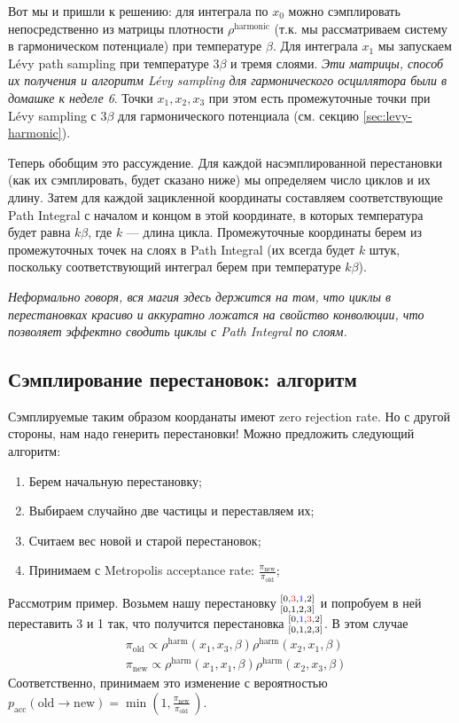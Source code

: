 \begin{lecture}
Вот мы и пришли к решению: для интеграла по $x_0$ можно сэмплировать непосредственно из матрицы плотности $\rho^{\text{harmonic}}$ (т.к. мы рассматриваем систему в гармоническом потенциале) при температуре $\beta$.
Для интеграла $x_1$ мы запускаем Lévy path sampling при температуре $3\beta$ и тремя слоями. \textit{Эти матрицы, способ их получения и алгоритм Lévy sampling для гармонического осциллятора были в домашке к неделе 6}.
Точки $x_1, x_2, x_3$ при этом есть промежуточные точки при Lévy sampling с $3\beta$ для гармонического потенциала (см. секцию \ref{sec:levy-harmonic}).

Теперь обобщим это рассуждение.
Для каждой насэмплированной перестановки (как их сэмплировать, будет сказано ниже) мы определяем число циклов и их длину.
Затем для каждой зацикленной координаты составляем соответствующие Path Integral с началом и концом в этой координате, в которых температура будет равна $k\beta$, где $k$ --- длина цикла.
Промежуточные координаты берем из промежуточных точек на слоях в Path Integral (их всегда будет $k$ штук, поскольку соответствующий интеграл берем при температуре $k\beta$).

\textit{Неформально говоря, вся магия здесь держится на том, что циклы в перестановках красиво и аккуратно ложатся на свойство конволюции, что позволяет эффектно сводить циклы с Path Integral по слоям.}

\subsection{Сэмплирование перестановок: алгоритм}

Сэмплируемые таким образом коорданаты имеют zero rejection rate.
Но с другой стороны, нам надо генерить перестановки!
Можно предложить следующий алгоритм:
\begin{enumerate}
    \item Берем начальную перестановку;
    \item Выбираем случайно две частицы и переставляем их;
    \item Считаем вес новой и старой перестановок;
    \item Принимаем с Metropolis acceptance rate: $\frac{\pi_\text{new}}{\pi_\text{old}}$;
\end{enumerate}

Рассмотрим пример.
Возьмем нашу перестановку ${}^{[0, {\color{red} 3}, {\color{blue} 1}, 2]}_{[0, 1, 2, 3]}$ и попробуем в ней переставить 3 и 1 так, что получится перестановка ${}^{[0, {\color{blue} 1}, {\color{red} 3}, 2]}_{[0, 1, 2, 3]}$.
В этом случае
\begin{align*}
    & \pi_\text{old} \propto \rho^{\text{harm}} (x_1, x_3, \beta) \rho^{\text{harm}}(x_2, x_1, \beta) \\
    & \pi_\text{new} \propto \rho^{\text{harm}}(x_1, x_1, \beta) \rho^{\text{harm}}(x_2, x_3, \beta)
\end{align*}
Соответственно, принимаем это изменение с вероятностью $p_\text{acc} (\text{old} \rightarrow \text{new}) = \min\left( 1, \frac{\pi_\text{new}}{\pi_\text{old}}\, \right)$.


\end{lecture}
